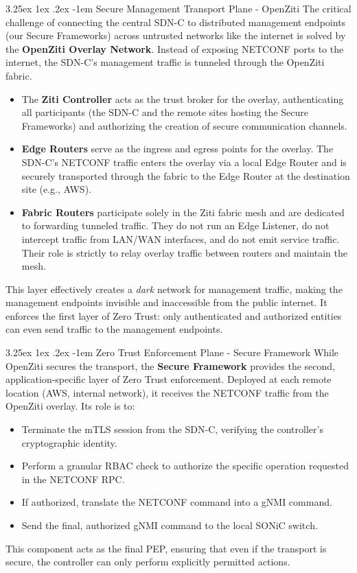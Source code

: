 \documentclass[12pt, a4paper, reqno, oneside]{book}
\makeatletter
\renewcommand\paragraph{\@startsection{paragraph}{5}{\z@}%
  {3.25ex \@plus1ex \@minus.2ex}%
  {-1em}%
  {\normalfont\normalsize\bfseries}}
\makeatother
\begin{document}
\paragraph{Secure Management Transport Plane - OpenZiti}
The critical challenge of connecting the central SDN-C to distributed management endpoints (our Secure Frameworks) across untrusted networks like the internet is solved by the \textbf{OpenZiti Overlay Network}. Instead of exposing NETCONF ports to the internet, the SDN-C's management traffic is tunneled through the OpenZiti fabric.
\begin{itemize}
    \item The \textbf{Ziti Controller} acts as the trust broker for the overlay, authenticating all participants (the SDN-C and the remote sites hosting the Secure Frameworks) and authorizing the creation of secure communication channels.
    \item \textbf{Edge Routers} serve as the ingress and egress points for the overlay. The SDN-C's NETCONF traffic enters the overlay via a local Edge Router and is securely transported through the fabric to the Edge Router at the destination site (e.g., AWS).
\item \textbf{Fabric Routers} participate solely in the Ziti fabric mesh and are dedicated to forwarding tunneled traffic. They do not run an Edge Listener, do not intercept traffic from LAN/WAN interfaces, and do not emit service traffic. Their role is strictly to relay overlay traffic between routers and maintain the mesh. 
\end{itemize}

This layer effectively creates a \textit{dark} network for management traffic, making the management endpoints invisible and inaccessible from the public internet. It enforces the first layer of Zero Trust: only authenticated and authorized entities can even send traffic to the management endpoints.

\paragraph{Zero Trust Enforcement Plane - Secure Framework}
While OpenZiti secures the transport, the \textbf{Secure Framework} provides the second, application-specific layer of Zero Trust enforcement. Deployed at each remote location (AWS, internal network), it receives the NETCONF traffic from the OpenZiti overlay. Its role is to:
\begin{itemize}
    \item Terminate the mTLS session from the SDN-C, verifying the controller's cryptographic identity.
    \item Perform a granular RBAC check to authorize the specific operation requested in the NETCONF RPC.
    \item If authorized, translate the NETCONF command into a gNMI command.
    \item Send the final, authorized gNMI command to the local SONiC switch.
\end{itemize}
This component acts as the final PEP, ensuring that even if the transport is secure, the controller can only perform explicitly permitted actions.
\end{document}
